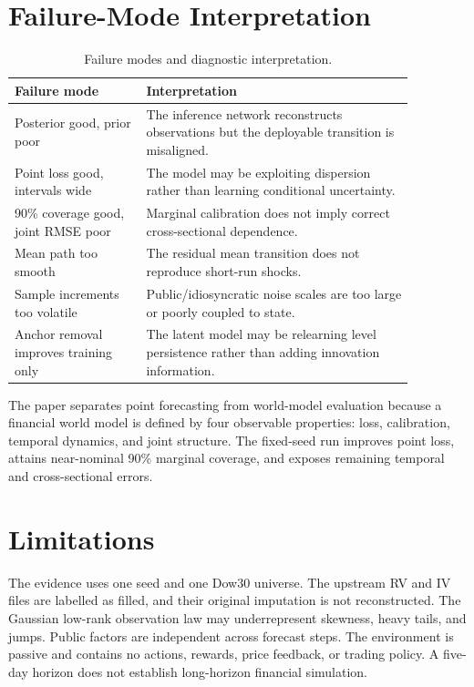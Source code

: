 \documentclass[11pt]{article}
\begin{document}
\section{Failure-Mode Interpretation}
\begin{table}[h]
\centering
\caption{Failure modes and diagnostic interpretation.}
\begin{tabular}{p{0.29\linewidth}p{0.58\linewidth}}
\toprule Failure mode & Interpretation\\
\midrule
Posterior good, prior poor & The inference network reconstructs observations but the deployable transition is misaligned.\\
Point loss good, intervals wide & The model may be exploiting dispersion rather than learning conditional uncertainty.\\
90\% coverage good, joint RMSE poor & Marginal calibration does not imply correct cross-sectional dependence.\\
Mean path too smooth & The residual mean transition does not reproduce short-run shocks.\\
Sample increments too volatile & Public/idiosyncratic noise scales are too large or poorly coupled to state.\\
Anchor removal improves training only & The latent model may be relearning level persistence rather than adding innovation information.\\
\bottomrule
\end{tabular}
\end{table}

The paper separates point forecasting from world-model evaluation because a financial world model is defined by four observable properties: loss, calibration, temporal dynamics, and joint structure. The fixed-seed run improves point loss, attains near-nominal 90\% marginal coverage, and exposes remaining temporal and cross-sectional errors.

\section{Limitations}
The evidence uses one seed and one Dow30 universe. The upstream RV and IV files are labelled as filled, and their original imputation is not reconstructed. The Gaussian low-rank observation law may underrepresent skewness, heavy tails, and jumps. Public factors are independent across forecast steps. The environment is passive and contains no actions, rewards, price feedback, or trading policy. A five-day horizon does not establish long-horizon financial simulation.
\end{document}
